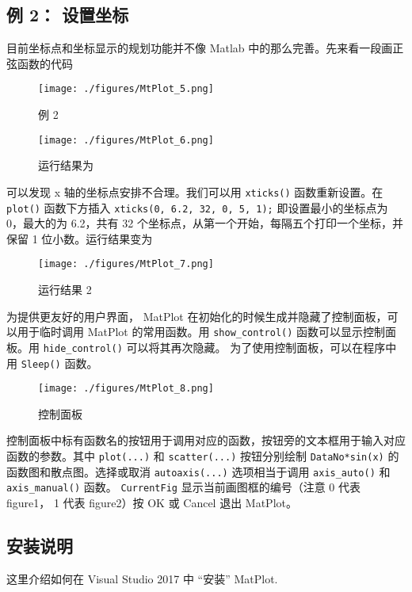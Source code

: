 \subsection{例 2： 设置坐标}

目前坐标点和坐标显示的规划功能并不像 Matlab 中的那么完善。先来看一段画正弦函数的代码

\begin{figure}[ht]
\centering
\texttt{[image: ./figures/MtPlot\_5.png]}
\caption{例 2} \label{MtPlot_fig5}
\end{figure}

\begin{figure}[ht]
\centering
\texttt{[image: ./figures/MtPlot\_6.png]}
\caption{运行结果为} \label{MtPlot_fig6}
\end{figure}

可以发现 x 轴的坐标点安排不合理。我们可以用 \verb|xticks()| 函数重新设置。在 \verb|plot()| 函数下方插入
\verb|xticks(0, 6.2, 32, 0, 5, 1);|
即设置最小的坐标点为 0，最大的为 6.2，共有 32 个坐标点，从第一个开始，每隔五个打印一个坐标，并保留 1 位小数。运行结果变为

\begin{figure}[ht]
\centering
\texttt{[image: ./figures/MtPlot\_7.png]}
\caption{运行结果 2} \label{MtPlot_fig7}
\end{figure}

为提供更友好的用户界面， MatPlot 在初始化的时候生成并隐藏了控制面板，可以用于临时调用 MatPlot 的常用函数。用 \verb|show_control()| 函数可以显示控制面板。用 \verb|hide_control()| 可以将其再次隐藏。 为了使用控制面板，可以在程序中用 \verb|Sleep()| 函数。

\begin{figure}[ht]
\centering
\texttt{[image: ./figures/MtPlot\_8.png]}
\caption{控制面板} \label{MtPlot_fig8}
\end{figure}

控制面板中标有函数名的按钮用于调用对应的函数，按钮旁的文本框用于输入对应函数的参数。其中 \verb|plot(...)| 和 \verb|scatter(...)| 按钮分别绘制 \verb|DataNo*sin(x)| 的函数图和散点图。选择或取消 \verb|autoaxis(...)| 选项相当于调用 \verb|axis_auto()| 和 \verb|axis_manual()| 函数。 \verb|CurrentFig| 显示当前画图框的编号（注意 0 代表 figure1， 1 代表 figure2）按 OK 或 Cancel 退出 MatPlot。


\subsection{安装说明}
这里介绍如何在 Visual Studio 2017 中 “安装” MatPlot. 

